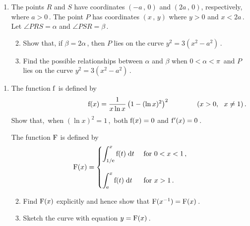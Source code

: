 \documentclass[a4, 11pt]{report}
\newlength{\qspace}
\newcounter{qnumber}
\newenvironment{question}%
 {\vspace{\qspace}
  \begin{enumerate}[\bfseries 1\quad][10]%
    \setcounter{enumi}{\value{qnumber}}%
    \item%
 }
{
  \end{enumerate}
  \filbreak
  \stepcounter{qnumber}
 }
\newenvironment{questionparts}[1][1]%
 {
  \begin{enumerate}[\bfseries (i)]%
    \setcounter{enumii}{#1}
    \addtocounter{enumii}{-1}
    \setlength{\itemsep}{5mm}
    \setlength{\parskip}{8pt}
 }
 {
  \end{enumerate}
 }
\def\f{{\rm f}}
\def\F{{\rm F}}
\newcommand{\ds}{\displaystyle}
\begin{document}
\begin{question}
The points $R$ and $S$ have coordinates $(-a\,,\, 0)$ and $(2a\,,\, 0)$, 
respectively, where $a > 0\,$. 
The point $P$ has coordinates $(x\,,\, y)$ where $y > 0$ and $x < 2a\,$. 
Let $\angle PRS = \alpha $ and $\angle PSR = \beta\,$.

\begin{questionparts}
\item
 Show that, if $\beta = 2 \alpha\,$, then $P$
 lies on the curve $y^2=3(x^2-a^2)\,$.

\item
Find the possible relationships between $\alpha$ and $\beta$ when 
$0 < \alpha < \pi\,$ and
$P$ lies on the curve $y^2=3(x^2-a^2)\,$.

\end{questionparts}

\end{question}




\begin{question}
The function  $\f$ is defined  by
\[
\phantom{\ \ \ \ \ \ \ \ \ \ \ \ (x>0, \  \ x\ne1)}
\f(x) 
= 
\frac{1}{x\ln x} 
\left(1 -  (\ln x)^2 \right)^2
\ \ \ \ \ \ \ \ \ \ \  \ (x>0, \  \ x\ne1)
\,.\]
Show that,\, 
when $( \ln x )^2 = 1\,$,\, 
both $\f(x)=0$ and $\f'(x)=0\,$. 

The function $\F$ is defined by
\begin{equation*}
\F(x) 
= 
\begin{cases} 
     \ds \int_{ 1/\text{\footnotesize e}}^x   
\f(t) \; \mathrm{d}t \hfill 
& \text{ for } 0<x<1\,, 
\\[7mm]
      \ds \int_{\text{\footnotesize e}}^x \f(t) \; \mathrm{d}t  \hfill 
& \text{ for } x>1\,. \\
  \end{cases} 
\end{equation*}

\begin{questionparts}
\item Find $\F(x)$ explicitly and hence 
show that $\F(x^{-1})=\F(x)\,$.
\item Sketch 
the curve with equation $y=\F(x)\,$.

\end{questionparts}

\end{question}
\end{document}
